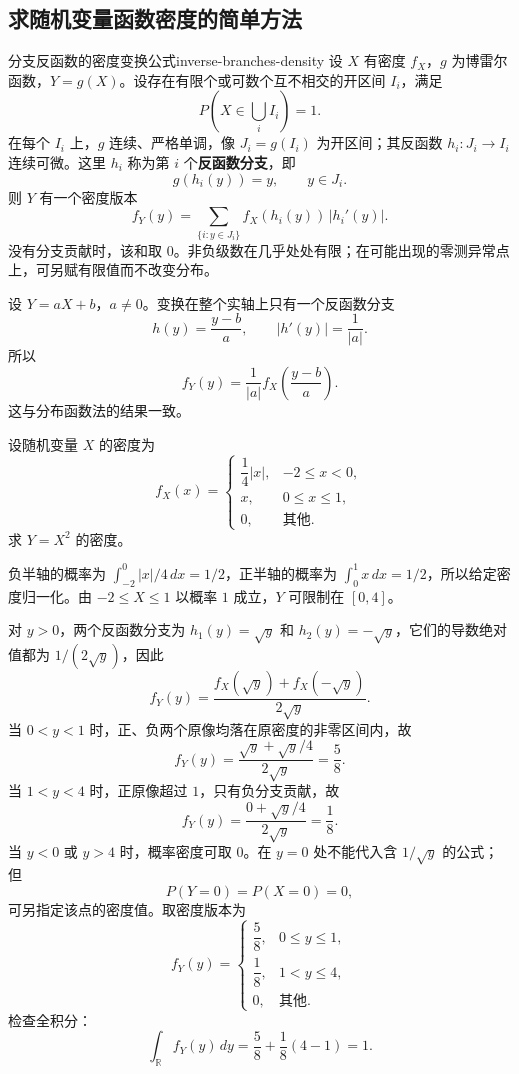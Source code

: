 \subsection*{求随机变量函数密度的简单方法}

\begin{mytheorem}{分支反函数的密度变换公式}{inverse-branches-density}
设 $X$ 有密度 $f_X$，$g$ 为博雷尔函数，$Y=g(X)$。设存在有限个或可数个互不相交的开区间 $I_i$，满足
\[
P\left(X\in\bigcup_i I_i\right)=1.
\]
在每个 $I_i$ 上，$g$ 连续、严格单调，像 $J_i=g(I_i)$ 为开区间；其反函数 $h_i:J_i\to I_i$ 连续可微。这里 $h_i$ 称为第 $i$ 个\textbf{反函数分支}，即
\[
g(h_i(y))=y,\qquad y\in J_i.
\]
则 $Y$ 有一个密度版本
\[
f_Y(y)=\sum_{\{i:y\in J_i\}}f_X(h_i(y))\,|h_i'(y)|.
\]
没有分支贡献时，该和取 $0$。非负级数在几乎处处有限；在可能出现的零测异常点上，可另赋有限值而不改变分布。
\end{mytheorem}

\begin{example}[用反函数公式求线性变换的密度]
设 $Y=aX+b$，$a\ne0$。变换在整个实轴上只有一个反函数分支
\[
h(y)=\frac{y-b}{a},\qquad |h'(y)|=\frac1{|a|}.
\]
所以
\[
f_Y(y)=\frac1{|a|}f_X\left(\frac{y-b}{a}\right).
\]
这与分布函数法的结果一致。
\end{example}

\begin{example}[平方变换与不同分支的取值范围]
设随机变量 $X$ 的密度为
\[
f_X(x)=
\begin{cases}
\dfrac14|x|,&-2\leq x<0,\\
x,&0\leq x\leq1,\\
0,&\text{其他}.
\end{cases}
\]
求 $Y=X^2$ 的密度。

负半轴的概率为 $\int_{-2}^0|x|/4\,dx=1/2$，正半轴的概率为 $\int_0^1x\,dx=1/2$，所以给定密度归一化。由 $-2\leq X\leq1$ 以概率 $1$ 成立，$Y$ 可限制在 $[0,4]$。

对 $y>0$，两个反函数分支为 $h_1(y)=\sqrt y$ 和 $h_2(y)=-\sqrt y$，它们的导数绝对值都为 $1/(2\sqrt y)$，因此
\[
f_Y(y)=\frac{f_X(\sqrt y)+f_X(-\sqrt y)}{2\sqrt y}.
\]
当 $0<y<1$ 时，正、负两个原像均落在原密度的非零区间内，故
\[
f_Y(y)=\frac{\sqrt y+\sqrt y/4}{2\sqrt y}=\frac58.
\]
当 $1<y<4$ 时，正原像超过 $1$，只有负分支贡献，故
\[
f_Y(y)=\frac{0+\sqrt y/4}{2\sqrt y}=\frac18.
\]
当 $y<0$ 或 $y>4$ 时，概率密度可取 $0$。在 $y=0$ 处不能代入含 $1/\sqrt y$ 的公式；但
\[
P(Y=0)=P(X=0)=0,
\]
可另指定该点的密度值。取密度版本为
\[
f_Y(y)=
\begin{cases}
\dfrac58,&0\leq y\leq1,\\
\dfrac18,&1<y\leq4,\\
0,&\text{其他}.
\end{cases}
\]
检查全积分：
\[
\int_{\mathbb R}f_Y(y)\,dy=\frac58+\frac18(4-1)=1.
\]
\end{example}

